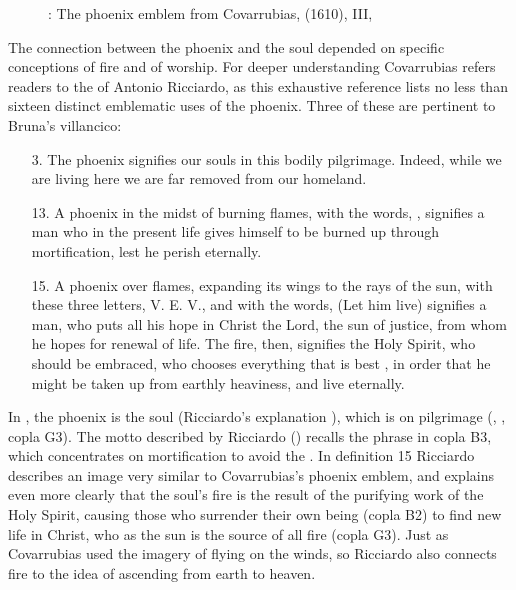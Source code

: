 
\begin{figure}
    \caption{: The phoenix emblem from Covarrubias,
     (1610),  III, }
    \label{fig:Covarrubias-phoenix}
\end{figure}

The connection between the phoenix and the soul depended on specific
conceptions of fire and of worship.
For deeper understanding Covarrubias refers readers to the  of Antonio Ricciardo, as this exhaustive reference lists no less
than sixteen distinct emblematic uses of the phoenix.
Three of these are pertinent to Bruna's villancico:
\begin{quoting}
    \begin{enumerate}
        \item[3.] The phoenix signifies our souls in this bodily pilgrimage.  
            Indeed, while we are living here we are far removed from our
            homeland.
        \item[13.] A phoenix in the midst of burning flames, with the words,
             , signifies a man who in
            the present life gives himself to be burned up through 
            mortification, lest he perish eternally.
        \item[15.] A phoenix over flames, expanding its wings to the rays of
            the sun, with these three letters, V. E. V., and with the words,
             (Let him live) \Dots{} signifies a man, who puts
            all his hope in Christ the Lord, the sun of justice, from whom he
            hopes for renewal of life.  
            The fire, then, signifies the Holy Spirit, who should be embraced,
            who chooses everything that is best , in order
            that he might be taken up from earthly heaviness, and live
            eternally.%
                \Autocite[, 132--133]
                {Ricciardo:CommentariaSymbolica}
    \end{enumerate}
\end{quoting}
In , the phoenix is the soul (Ricciardo's
explanation ), which is on pilgrimage (, , copla G3).
The motto  described by Ricciardo () recalls
the phrase  in copla B3, which concentrates on
mortification to avoid the .
In definition 15 Ricciardo describes an image very similar to Covarrubias's
phoenix emblem, and explains even more clearly that the soul's fire is the
result of the purifying work of the Holy Spirit, causing those who surrender
their own being (copla B2) to find new life in Christ, who as the sun is the
source of all fire (copla G3).
Just as Covarrubias used the imagery of flying on the winds, so Ricciardo also
connects fire to the idea of ascending from earth to heaven.

